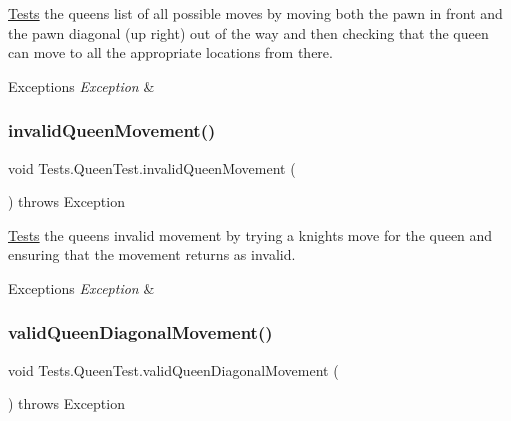 \hyperlink{namespace_tests}{Tests} the queen\textquotesingle{}s list of all possible moves by moving both the pawn in front and the pawn diagonal (up right) out of the way and then checking that the queen can move to all the appropriate locations from there. 
\begin{DoxyExceptions}{Exceptions}
{\em Exception} & \\
\hline
\end{DoxyExceptions}
\hypertarget{class_tests_1_1_queen_test_a0948894af0233e52a11873b7506674bb}{}\label{class_tests_1_1_queen_test_a0948894af0233e52a11873b7506674bb} 
\subsubsection{\texorpdfstring{invalid\+Queen\+Movement()}{invalidQueenMovement()}}
{\footnotesize\ttfamily void Tests.\+Queen\+Test.\+invalid\+Queen\+Movement (\begin{DoxyParamCaption}{ }\end{DoxyParamCaption}) throws Exception}

\hyperlink{namespace_tests}{Tests} the queen\textquotesingle{}s invalid movement by trying a knight\textquotesingle{}s move for the queen and ensuring that the movement returns as invalid. 
\begin{DoxyExceptions}{Exceptions}
{\em Exception} & \\
\hline
\end{DoxyExceptions}
\hypertarget{class_tests_1_1_queen_test_ae35369361ac4313f3bf86f111479fa75}{}\label{class_tests_1_1_queen_test_ae35369361ac4313f3bf86f111479fa75} 
\subsubsection{\texorpdfstring{valid\+Queen\+Diagonal\+Movement()}{validQueenDiagonalMovement()}}
{\footnotesize\ttfamily void Tests.\+Queen\+Test.\+valid\+Queen\+Diagonal\+Movement (\begin{DoxyParamCaption}{ }\end{DoxyParamCaption}) throws Exception}

